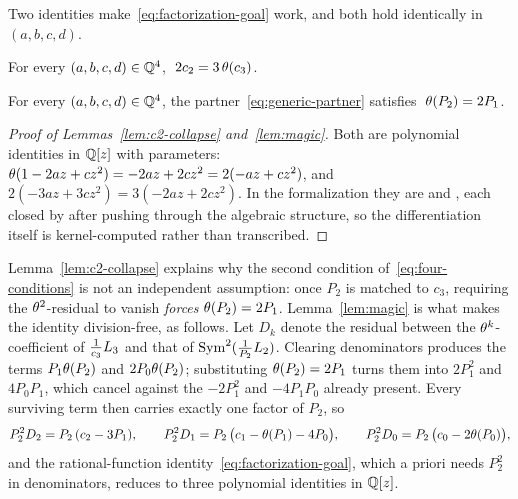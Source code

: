 Two identities make~\eqref{eq:factorization-goal} work, and both hold
identically in $(a,b,c,d)$.

\begin{lemma}
\label{lem:c2-collapse}
For every $(a,b,c,d)\in\mathbb{Q}^4$, $\;2c_2 = 3\,\theta(c_3)$.
\end{lemma}

\begin{lemma}\label{lem:magic}
For every $(a,b,c,d)\in\mathbb{Q}^4$, the partner~\eqref{eq:generic-partner}
satisfies $\;\theta(P_2) = 2P_1$.
\end{lemma}

\begin{proof}[Proof of Lemmas~\ref{lem:c2-collapse} and~\ref{lem:magic}]
Both are polynomial identities in $\mathbb{Q}[z]$ with parameters: $\theta(1-2az+cz^2)
= -2az + 2cz^2 = 2(-az+cz^2)$, and $2(-3az+3cz^2) = 3(-2az+2cz^2)$. In the
formalization they are  and
, each closed by  after
pushing  through the algebraic structure, so
the differentiation itself is kernel-computed rather than transcribed.
\end{proof}

Lemma~\ref{lem:c2-collapse} explains why the second condition
of~\eqref{eq:four-conditions} is not an independent assumption: once $P_2$ is
matched to $c_3$, requiring the $\theta^2$-residual to vanish
\emph{forces} $\theta(P_2) = 2P_1$. Lemma~\ref{lem:magic} is what makes the
identity division-free, as follows. Let
$D_k$ denote the residual between the $\theta^k$-coefficient of
$\frac{1}{c_3}L_3$ and that of $\operatorname{Sym}^2(\frac{1}{P_2}L_2)$. Clearing
denominators produces the terms $P_1\theta(P_2)$ and $2P_0\theta(P_2)$;
substituting $\theta(P_2) = 2P_1$ turns them into $2P_1^2$ and $4P_0P_1$,
which cancel against the $-2P_1^2$ and $-4P_1P_0$ already present. Every
surviving term then carries exactly one factor of $P_2$, so
\begin{equation}\label{eq:cleared-residuals}
  P_2^2 D_2 = P_2\,(c_2 - 3P_1),\qquad
  P_2^2 D_1 = P_2\,\bigl(c_1 - \theta(P_1) - 4P_0\bigr),\qquad
  P_2^2 D_0 = P_2\,\bigl(c_0 - 2\theta(P_0)\bigr),
\end{equation}
and the rational-function identity~\eqref{eq:factorization-goal}, which
a priori needs $P_2^2$ in denominators, reduces to three polynomial
identities in $\mathbb{Q}[z]$.

